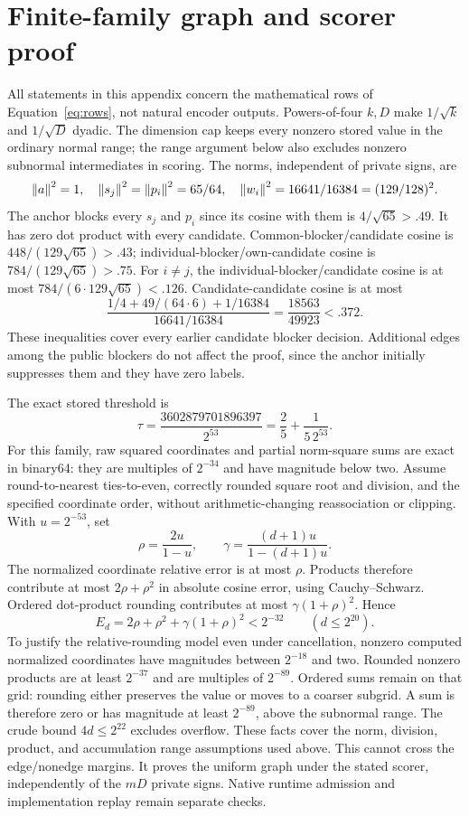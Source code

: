 \section{Finite-family graph and scorer proof}\label{app:scorer}
All statements in this appendix concern the mathematical rows of
Equation~\eqref{eq:rows}, not natural encoder outputs. Powers-of-four
$k,D$ make $1/\sqrt{k}$ and $1/\sqrt D$ dyadic. The dimension cap keeps
every nonzero stored value in the ordinary normal range; the range argument
below also excludes nonzero subnormal intermediates in scoring.
The norms, independent of private signs, are
\[
 \left\lVert a\right\rVert^2=1,\quad \left\lVert s_j\right\rVert^2=\left\lVert p_i\right\rVert^2=65/64,
 \quad \left\lVert w_i\right\rVert^2=16641/16384=(129/128)^2.
\]
The anchor blocks every $s_j$ and $p_i$ since its cosine with them is
$4/\sqrt{65}>.49$. It has zero dot product with every candidate.
Common-blocker/candidate cosine is
$448/(129\sqrt{65})>.43$; individual-blocker/own-candidate cosine is
$784/(129\sqrt{65})>.75$. For $i\ne j$, the individual-blocker/candidate
cosine is at most $784/(6\cdot129\sqrt{65})<.126$.
Candidate-candidate cosine is at most
\[
 \frac{1/4+49/(64\cdot6)+1/16384}{16641/16384}
                 =\frac{18563}{49923}<.372.
\]
These inequalities cover every earlier candidate blocker decision.
Additional edges among the public blockers do not affect the proof,
since the anchor initially suppresses them and they have zero labels.

The exact stored threshold is
\[
 \tau=\frac{3602879701896397}{2^{53}}
      =\frac25+\frac{1}{5\,2^{53}}.
\]
For this family, raw squared coordinates and partial norm-square sums
are exact in binary64: they are multiples of $2^{-34}$ and have
magnitude below two. Assume round-to-nearest ties-to-even, correctly
rounded square root and division, and the specified coordinate order,
without arithmetic-changing reassociation or clipping. With
$u=2^{-53}$, set
\[
 \rho=\frac{2u}{1-u},\qquad
 \gamma=\frac{(d+1)u}{1-(d+1)u}.
\]
The normalized coordinate relative error is at most $\rho$. Products
therefore contribute at most $2\rho+\rho^2$ in absolute cosine error,
using Cauchy--Schwarz. Ordered dot-product rounding contributes at most
$\gamma(1+\rho)^2$. Hence
\[
E_d=2\rho+\rho^2+\gamma(1+\rho)^2<2^{-32}
                    \qquad(d\le2^{20}).
\]
To justify the relative-rounding model even under cancellation, nonzero
computed normalized coordinates have magnitudes between $2^{-18}$ and
two. Rounded nonzero products are at least $2^{-37}$ and are multiples
of $2^{-89}$. Ordered sums remain on that grid: rounding either preserves
the value or moves to a coarser subgrid. A sum is therefore zero or has
magnitude at least $2^{-89}$, above the subnormal range. The crude bound
$4d\le2^{22}$ excludes overflow. These facts cover the norm, division,
product, and accumulation range assumptions used above.
This cannot cross the edge/nonedge margins. It proves the uniform graph
under the stated scorer, independently of the $mD$ private signs.
Native runtime admission and implementation replay remain separate checks.

